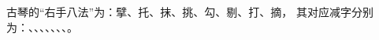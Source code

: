 \documentclass[a4paper]{ctexart}
\begin{document}
古琴的“右手八法”为：擘、托、抹、挑、勾、剔、打、摘，
其对应减字分别为：、、、、、、、。 
\end{document}

